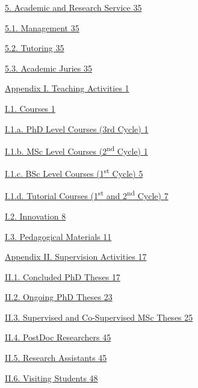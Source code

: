 \documentclass[
]{article}
\begin{document}
\hyperref[academic-and-research-service]{5. Academic and Research
Service \hyperref[academic-and-research-service]{35}}

\hyperref[management]{5.1. Management \hyperref[management]{35}}

\hyperref[tutoring]{5.2. Tutoring \hyperref[tutoring]{35}}

\hyperref[academic-juries]{5.3. Academic Juries
\hyperref[academic-juries]{35}}

\hyperref[teaching-activities]{Appendix I. Teaching Activities
\hyperref[teaching-activities]{1}}

\hyperref[courses-1]{I.1. Courses \hyperref[courses-1]{1}}

\hyperref[phd-level-courses-3rd-cycle]{I.1.a. PhD Level Courses (3rd
Cycle) \hyperref[phd-level-courses-3rd-cycle]{1}}

\hyperref[msc-level-courses-2nd-cycle]{I.1.b. MSc Level Courses
(2\textsuperscript{nd} Cycle) \hyperref[msc-level-courses-2nd-cycle]{1}}

\hyperref[bsc-level-courses-1st-cycle]{I.1.c. BSc Level Courses
(1\textsuperscript{st} Cycle) \hyperref[bsc-level-courses-1st-cycle]{5}}

\hyperref[tutorial-courses-1st-and-2nd-cycle]{I.1.d. Tutorial Courses
(1\textsuperscript{st} and 2\textsuperscript{nd} Cycle)
\hyperref[tutorial-courses-1st-and-2nd-cycle]{7}}

\hyperref[innovation]{I.2. Innovation \hyperref[innovation]{8}}

\hyperref[pedagogical-materials]{I.3. Pedagogical Materials
\hyperref[pedagogical-materials]{11}}

\hyperref[supervision-activities]{Appendix II. Supervision Activities
\hyperref[supervision-activities]{17}}

\hyperref[concluded-phd-theses]{II.1. Concluded PhD Theses
\hyperref[concluded-phd-theses]{17}}

\hyperref[ongoing-phd-theses]{II.2. Ongoing PhD Theses
\hyperref[ongoing-phd-theses]{23}}

\hyperref[supervised-and-co-supervised-msc-theses]{II.3. Supervised and
Co-Supervised MSc Theses
\hyperref[supervised-and-co-supervised-msc-theses]{25}}

\hyperref[postdoc-researchers]{II.4. PostDoc Researchers
\hyperref[postdoc-researchers]{45}}

\hyperref[research-assistants]{II.5. Research Assistants
\hyperref[research-assistants]{45}}

\hyperref[visiting-students]{II.6. Visiting Students
\hyperref[visiting-students]{48}}
\end{document}
